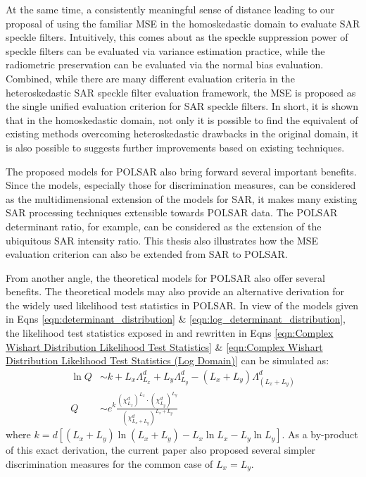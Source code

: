 At
                the same time, a consistently meaningful sense of
                distance leading to our proposal of using the familiar
                MSE in the homoskedastic domain to evaluate SAR speckle
                filters.
Intuitively,
                this comes about as the speckle suppression power of
                speckle filters can be evaluated via variance estimation
                practice, while the radiometric preservation can be
                evaluated via the normal bias evaluation.
Combined,
                while there are many different evaluation criteria in
                the heteroskedastic SAR speckle filter evaluation
                framework, the MSE is proposed as the single unified
                evaluation criterion for SAR speckle filters.
In
                short, it is shown that in the homoskedastic domain, not
                only it is possible to find the equivalent of existing
                methods overcoming heteroskedastic drawbacks in the
                original domain, it is also possible to suggests further
                improvements based on existing techniques.

The
                proposed models for POLSAR also bring forward several
                important benefits.
Since
                the models, especially those for discrimination
                measures, can be considered as the multidimensional
                extension of the models for SAR, it makes many existing
                SAR processing techniques extensible towards POLSAR
                data.
The POLSAR determinant ratio, for example, can be considered as
                the extension of the ubiquitous SAR intensity ratio.
This
                thesis also illustrates how the MSE evaluation
                criterion can also be extended from SAR to POLSAR.

From another angle, the theoretical models for POLSAR also offer several benefits.
The theoretical models may also provide an alternative derivation for the widely used likelihood test statistics in POLSAR.
In view of the models given in Eqns \ref{eqn:determinant_distribution} \& \ref{eqn:log_determinant_distribution},
  the likelihood test statistics exposed in \cite{Conradsen_2003_TGRS_4} and rewritten in Eqns \ref{eqn:Complex Wishart Distribution Likelihood Test Statistics} \& \ref{eqn:Complex Wishart Distribution Likelihood Test Statistics (Log Domain)}
can be simulated as:
\begin{align}
  \ln{Q} &\sim  k + L_x \Lambda^d_{L_x} + L_y \Lambda^d_{L_y} - (L_x + L_y) \Lambda^d_{(L_x + L_y)} \\
  Q &\sim e^k \frac{(\chi^d_{L_x})^{L_x} \cdot (\chi^d_{L_y})^{L_y}}{(\chi^d_{L_x + L_y})^{L_x + L_y}}   
\end{align}
where $k = d \left[ (L_x + L_y) \ln(L_x + L_y) - L_x \ln{L_x} - L_y \ln{L_y} \right]$.
As a by-product of this exact derivation, the current paper also proposed several simpler discrimination measures for the common case of $L_x=L_y$.

